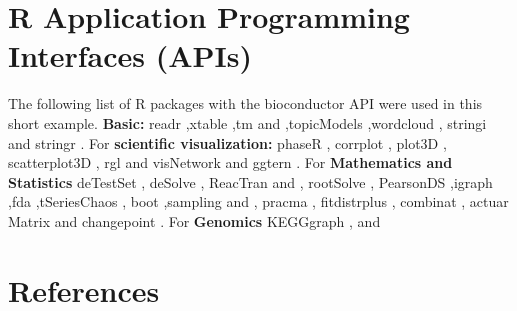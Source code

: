 
\section{R Application Programming Interfaces (APIs)}

The following list of R packages\cite{key1000} with the bioconductor API were used in this short example. \textbf{ Basic:} readr \cite{key1001},xtable \cite{key1002},tm \cite{key1003} and \cite{key1004},topicModels \cite{key1005},wordcloud \cite{key1006}, stringi \cite{key1007} and stringr \cite{key1008}.  For \textbf{scientific visualization:} phaseR \cite{key2001}, corrplot \cite{key2002}, plot3D \cite{key2003}, scatterplot3D \cite{key2004}, rgl \cite{key2005} and visNetwork \cite{key2006} and ggtern \cite{key2007}. For \textbf{Mathematics and Statistics} deTestSet \cite{key3001}, deSolve \cite{key3002}, ReacTran \cite{key3003} and \cite{key3004}, rootSolve \cite{key3005}, PearsonDS \cite{key3006},igraph \cite{key3007},fda \cite{key3008},tSeriesChaos \cite{key3009}, boot \cite{key3010},sampling \cite{key3011} and \cite{key3012}, pracma \cite{key3013}, fitdistrplus \cite{key3014}, combinat \cite{key3015}, actuar \cite{key3016} Matrix \cite{key3017} and changepoint \cite{key3018}.  For \textbf{Genomics} KEGGgraph \cite{key4001}, \cite{key4002} and \cite{key4003}

\section{References}

